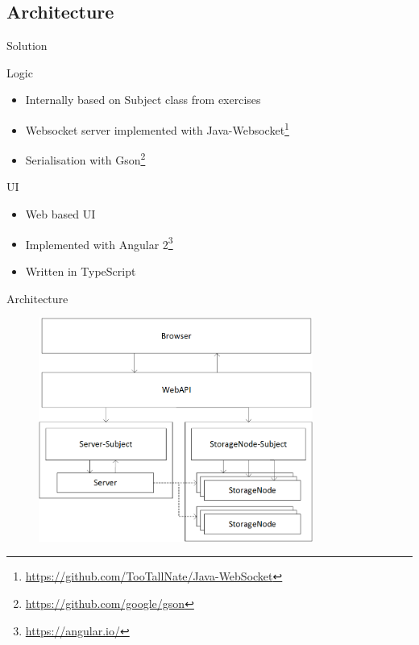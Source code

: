 \documentclass{beamer}
\begin{document}
	\subsection{Architecture}
	\begin{frame}{Solution}
		\begin{block}{Logic}
			\begin{itemize}
				\item Internally based on Subject class from exercises
				\item Websocket server implemented with Java-Websocket\footnote{\url{https://github.com/TooTallNate/Java-WebSocket}}
				\item Serialisation with Gson\footnote{\url{https://github.com/google/gson}}
			\end{itemize}
		\end{block}
		\begin{block}{UI}
			\begin{itemize}
				\item Web based UI
				\item Implemented with Angular 2\footnote{\url{https://angular.io/}}
				\item Written in TypeScript
			\end{itemize}
		\end{block}
	\end{frame}
	\begin{frame}{Architecture}
		\begin{figure}
			\hspace{0.1cm}
			\raggedright
			\begin{minipage}{1cm}
				\includegraphics[width=9cm]{architecture.png}
			\end{minipage}
		\end{figure}
	\end{frame}
\end{document}
